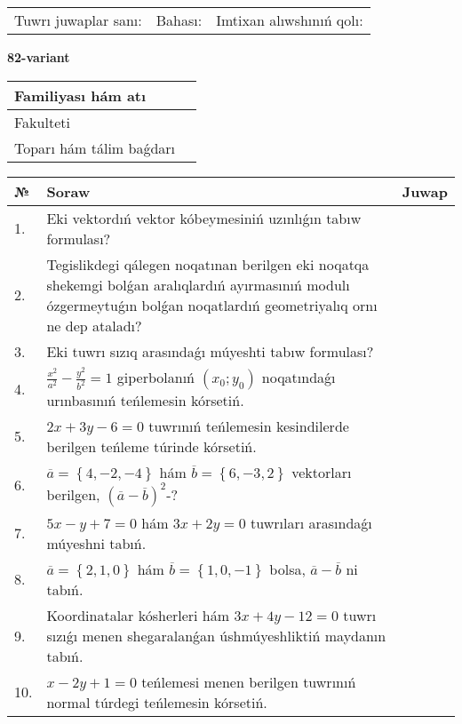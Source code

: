 \documentclass{article}
\begin{document}
\vspace{1cm}

\begin{tabular}{lll}
Tuwrı juwaplar sanı: \underline{\hspace{1.5cm}} & 
Bahası: \underline{\hspace{1.5cm}} & 
Imtixan alıwshınıń qolı: \underline{\hspace{2cm}} \\
\end{tabular}

\egroup

\newpage


\textbf{82-variant}\\

\bgroup
\def\arraystretch{1.6} %

\begin{tabular}{|m{5.7cm}|m{9.5cm}|}
\hline
Familiyası hám atı & \\
\hline
Fakulteti  & \\
\hline
Toparı hám tálim baǵdarı  & \\
\hline
\end{tabular}

\vspace{1cm}

\begin{tabular}{|m{0.7cm}|m{10cm}|m{4cm}|}
\hline
№ & Soraw & Juwap \\
\hline
1. & Eki vektordıń vektor kóbeymesiniń uzınlıǵın tabıw formulası? &  \\
\hline
2. & Tegislikdegi qálegen noqatınan berilgen eki noqatqa shekemgi bolǵan aralıqlardıń ayırmasınıń modulı ózgermeytuǵın bolǵan noqatlardıń geometriyalıq ornı ne dep ataladı? &  \\
\hline
3. & Eki tuwrı sızıq arasındaǵı múyeshti tabıw formulası? &  \\
\hline
4. & $\frac{x^2}{a^2}-\frac{y^2}{b^2}=1$ giperbolanıń $(x_0;y_0)$ noqatındaǵı urınbasınıń teńlemesin kórsetiń. &  \\
\hline
5. & $2x+3y-6=0$ tuwrınıń teńlemesin kesindilerde berilgen teńleme túrinde kórsetiń. &  \\
\hline
6. & $\overline{a}=\left\{ 4,-2,-4 \right\}$ hám $\overline{b}=\left\{ 6,-3, 2 \right\}$ vektorları berilgen, $(\overline{a}-\overline{b}) ^{2}$-? &  \\
\hline
7. & $5x-y+7=0$ hám $3x+2y=0$ tuwrıları arasındaǵı múyeshni tabıń. &  \\
\hline
8. & $\overline{a}=\left\{ 2, 1, 0 \right\}$ hám $\overline{b}=\left\{ 1, 0,-1 \right\}$ bolsa, $\overline{a}-\overline{b}$ ni tabıń. &  \\
\hline
9. & Koordinatalar kósherleri hám $ 3x+4y-12=0 $ tuwrı sızıǵı menen shegaralanǵan úshmúyeshliktiń maydanın tabıń. &  \\
\hline
10. & $x-2y+1=0$ teńlemesi menen berilgen tuwrınıń normal túrdegi teńlemesin kórsetiń. &  \\
\hline
\end{tabular}
\end{document}
